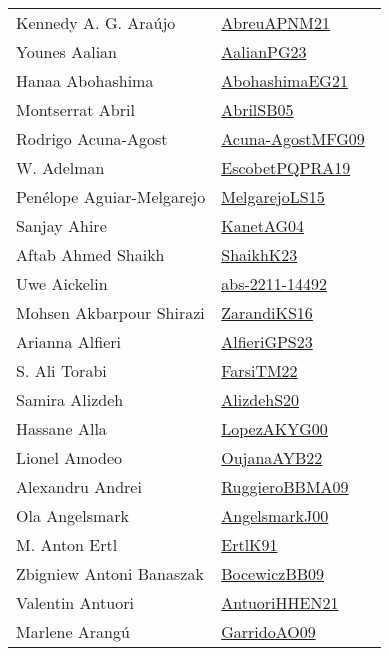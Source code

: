 {\begin{longtable}{p{4cm}p{20cm}}
Kennedy A. G. Ara{\'u}jo & \href{}{AbreuAPNM21}~\cite{AbreuAPNM21}\\
Younes Aalian & \href{works/AalianPG23.pdf}{AalianPG23}~\cite{AalianPG23}\\
Hanaa Abohashima & \href{works/AbohashimaEG21.pdf}{AbohashimaEG21}~\cite{AbohashimaEG21}\\
Montserrat Abril & \href{works/AbrilSB05.pdf}{AbrilSB05}~\cite{AbrilSB05}\\
Rodrigo Acuna{-}Agost & \href{works/Acuna-AgostMFG09.pdf}{Acuna-AgostMFG09}~\cite{Acuna-AgostMFG09}\\
W. Adelman & \href{works/EscobetPQPRA19.pdf}{EscobetPQPRA19}~\cite{EscobetPQPRA19}\\
Pen{\'{e}}lope Aguiar{-}Melgarejo & \href{works/MelgarejoLS15.pdf}{MelgarejoLS15}~\cite{MelgarejoLS15}\\
Sanjay Ahire & \href{}{KanetAG04}~\cite{KanetAG04}\\
Aftab Ahmed Shaikh & \href{}{ShaikhK23}~\cite{ShaikhK23}\\
Uwe Aickelin & \href{works/abs-2211-14492.pdf}{abs-2211-14492}~\cite{abs-2211-14492}\\
Mohsen Akbarpour Shirazi & \href{works/ZarandiKS16.pdf}{ZarandiKS16}~\cite{ZarandiKS16}\\
Arianna Alfieri & \href{works/AlfieriGPS23.pdf}{AlfieriGPS23}~\cite{AlfieriGPS23}\\
S. Ali Torabi & \href{}{FarsiTM22}~\cite{FarsiTM22}\\
Samira Alizdeh & \href{}{AlizdehS20}~\cite{AlizdehS20}\\
Hassane Alla & \href{works/LopezAKYG00.pdf}{LopezAKYG00}~\cite{LopezAKYG00}\\
Lionel Amodeo & \href{works/OujanaAYB22.pdf}{OujanaAYB22}~\cite{OujanaAYB22}\\
Alexandru Andrei & \href{works/RuggieroBBMA09.pdf}{RuggieroBBMA09}~\cite{RuggieroBBMA09}\\
Ola Angelsmark & \href{works/AngelsmarkJ00.pdf}{AngelsmarkJ00}~\cite{AngelsmarkJ00}\\
M. Anton Ertl & \href{works/ErtlK91.pdf}{ErtlK91}~\cite{ErtlK91}\\
Zbigniew Antoni Banaszak & \href{}{BocewiczBB09}~\cite{BocewiczBB09}\\
Valentin Antuori & \href{works/AntuoriHHEN21.pdf}{AntuoriHHEN21}~\cite{AntuoriHHEN21}\\
Marlene Arang{\'{u}} & \href{works/GarridoAO09.pdf}{GarridoAO09}~\cite{GarridoAO09}\\

\end{longtable}}
